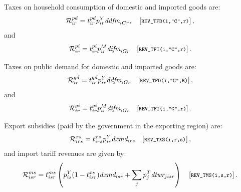 Taxes on household consumption of domestic and imported goods are:
$$\mathcal{R}^{pd}_{ir} = t^{pd}_{ir} p^Y_{ir} \textit{ddfm}_{iCr},
\quad [\footnotesize{\texttt{REV\_TFD(i,"C",r)}}]\,,$$ and
$$\mathcal{R}^{pi}_{ir} = t^{pi}_{ir} p^M_{ir} \textit{difm}_{iGr}
\quad [\footnotesize{\texttt{REV\_TFI(i,"C",r)}}]\,.$$

Taxes on public demand for domestic and imported goods are:
$$\mathcal{R}^{gd}_{ir} = t^{gd}_{ir} p^Y_{ir} \textit{ddfm}_{iGr}
\quad [\footnotesize{\texttt{REV\_TFD(i,"G",R)}}]\,,$$ and
$$\mathcal{R}^{gi}_{ir} =  t^{gi}_{ir} p^M_{ir} \textit{difm}_{iGr}
\quad [\footnotesize{\texttt{REV\_TFI(i,"G",r)}}]\,.$$

Export subsidies (paid by the government in the exporting region) are:
$$\mathcal{R}^{xs}_{irs} = t^{xs}_{irs} p^Y_{ir}
\textit{dxmd}_{irs} \quad [\footnotesize{\texttt{REV\_TXS(i,r,s)}}]\,,$$ and import tariff revenues are given by:
$$\mathcal{R}^{ms}_{isr} = t^{ms}_{isr} \left(p^Y_{is}
(1-t^{xs}_{isr}) \textit{dxmd}_{isr} + \sum_j p^T_j \textit{dtwr}_{jisr} \right) \quad [\footnotesize{\texttt{REV\_TMS(i,s,r)}}]\,.$$
